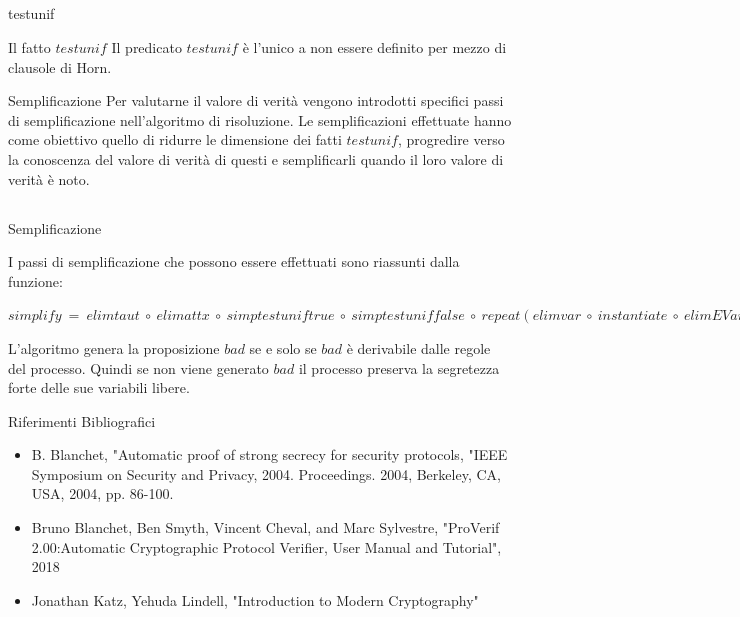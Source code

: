 \documentclass[11pt,xcolor=table]{beamer}
\begin{document}
\subsection{}
\begin{frame}{testunif}
    \begin{block}{Il fatto $testunif$}
        Il predicato $testunif$ è l'unico a non essere definito per mezzo di clausole di Horn.
    \end{block}
    
    \begin{block}{Semplificazione}
    Per valutarne il valore di verità vengono introdotti specifici passi di semplificazione nell'algoritmo di risoluzione. Le semplificazioni effettuate hanno come obiettivo quello di ridurre le dimensione dei fatti $testunif$, progredire verso la conoscenza del valore di verità di questi e semplificarli quando il loro valore di verità è noto.
    \end{block}
\end{frame}

\subsection{}
\begin{frame}{Semplificazione}

        I passi di semplificazione che possono essere effettuati sono riassunti dalla funzione:\\
        \begin{center}
            $simplify\ =\ elimtaut\ \circ \ elimattx\ \circ \ simptestuniftrue\ \circ \ simptestuniffalse\ \circ \ repeat(elimvar\ \circ \ instantiate\ \circ \ elimEVar\ \circ \ swap\ \circ \ unify) $
        \end{center}
    
    \begin{block}{}
        L'algoritmo genera la proposizione $bad$ se e solo se $bad$ è derivabile dalle regole del processo. Quindi se non viene generato $bad$ il processo preserva la segretezza forte delle sue variabili libere.
    \end{block}
\end{frame}

\begin{frame}{Riferimenti Bibliografici}
    \begin{itemize}
        \item B. Blanchet, "Automatic proof of strong secrecy for security protocols, "IEEE Symposium on Security and Privacy, 2004. Proceedings. 2004, Berkeley, CA, USA, 2004, pp. 86-100.
        \item Bruno Blanchet, Ben Smyth, Vincent Cheval, and Marc Sylvestre, "ProVerif 2.00:Automatic Cryptographic Protocol Verifier, User Manual and Tutorial", 2018 
        \item Jonathan Katz, Yehuda Lindell, "Introduction to Modern Cryptography"
    \end{itemize}
\end{frame}
\end{document}
